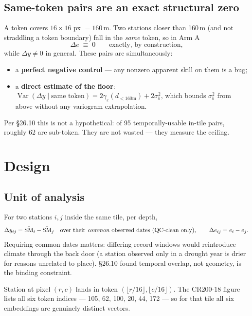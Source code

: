 \documentclass[11pt,a4paper]{article}
\newcommand{\Var}{\operatorname{Var}}
\begin{document}
\subsection{Same-token pairs are an exact structural zero}

A token covers $16 \times 16$ px $= 160$\,m. Two stations closer than 160\,m
(and not straddling a token boundary) fall in the \emph{same} token, so in Arm A
\begin{equation}
  \Delta e \;\equiv\; 0 \qquad\text{exactly, by construction,}
\end{equation}
while $\Delta y \ne 0$ in general. These pairs are simultaneously:
\begin{itemize}[nosep]
  \item a \textbf{perfect negative control} --- any nonzero apparent skill on them is a bug;
  \item a \textbf{direct estimate of the floor}: $\Var(\Delta y \mid \text{same token})
        = 2\gamma_\varepsilon(d_{<160\mathrm{m}}) + 2\sigma_b^2$, which bounds
        $\sigma_b^2$ from above without any variogram extrapolation.
\end{itemize}
Per \S26.10 this is not a hypothetical: of 95 temporally-usable in-tile pairs, roughly
62 are sub-token. They are not wasted --- they measure the ceiling.

\clearpage
\section{Design}

\subsection{Unit of analysis}

For two stations $i,j$ inside the same tile, per depth,
\[
  \Delta y_{ij} = \bar{\mathrm{SM}}_i - \bar{\mathrm{SM}}_j
  \quad\text{over their \emph{common} observed dates (QC-clean only)},
  \qquad
  \Delta e_{ij} = e_i - e_j .
\]
Requiring common dates matters: differing record windows would reintroduce climate through
the back door (a station observed only in a drought year is drier for reasons unrelated to
place). \S26.10 found temporal overlap, not geometry, is the binding constraint.

Station at pixel $(r,c)$ lands in token $(\lfloor r/16\rfloor, \lfloor c/16\rfloor)$.
The CR200-18 figure lists all six token indices --- 105, 62, 100, 20, 44, 172 --- so for
that tile all six embeddings are genuinely distinct vectors.
\end{document}

